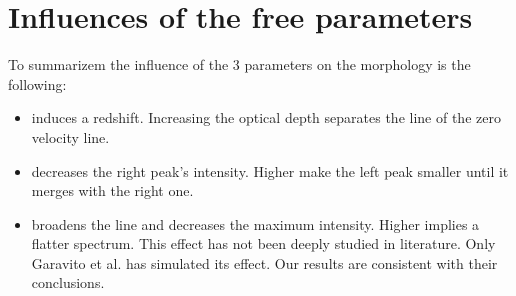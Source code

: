 \section{Influences of the free parameters}

To summarizem the influence of the 3 parameters on the \lya morphology is the following: 

\begin{itemize}
\item \tauh induces a redshift. Increasing the optical depth separates the line of the zero velocity line. \\
\item \vout decreases the right peak's intensity. Higher \vout make the left peak smaller until it merges with the right one. \\
\item \vrot broadens the line and decreases the maximum intensity. Higher \vrot implies a flatter spectrum. This effect has not been deeply studied in literature. Only Garavito et al. \cite{Garavito14} has simulated its effect. Our results are consistent with their conclusions. \\
\end{itemize}
